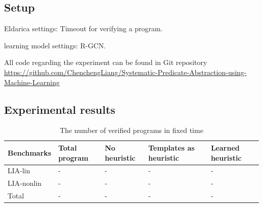 \documentclass{article}
\begin{document}
\subsection{Setup}

Eldarica settings:
Timeout for verifying a program.

learning model settings:
R-GCN.



All code regarding the experiment can be found in Git repository \href{https://github.com/ChenchengLiang/Systematic-Predicate-Abstraction-using-Machine-Learning}{https://github.com/ChenchengLiang/Systematic-Predicate-Abstraction-using-Machine-Learning}

\subsection{Experimental results}

\begin{table}[h]
\begin{center}
\begin{tabular}{lp{2cm}p{2cm}p{3.5cm}p{3cm}}
\hline
Benchmarks  & Total program  & No heuristic & Templates as heuristic & Learned heuristic\\
\hline
LIA-lin    & - & -&-&-\\
LIA-nonlin & - & -&-&-\\
Total  & - & -&-&-\\
\hline
\end{tabular}\caption{The number of verified programs in fixed time}
\end{center}
\end{table}
\end{document}

